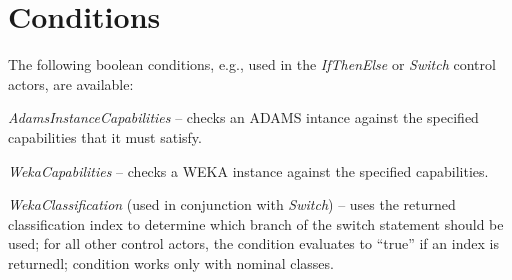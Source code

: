 \section{Conditions}
The following boolean conditions, e.g., used in the \textit{IfThenElse} or
\textit{Switch} control actors, are available:
\begin{tight_itemize}
	\item \textit{AdamsInstanceCapabilities} -- checks an ADAMS intance against
	the specified capabilities that it must satisfy.
	\item \textit{WekaCapabilities} -- checks a WEKA instance against the
	specified capabilities.
	\item \textit{WekaClassification} (used in conjunction with 
	\textit{Switch}) -- uses the returned classification index to determine 
	which branch of the switch statement should be used; for all other control 
	actors, the condition evaluates to ``true'' if an index is returnedl; 
	condition works only with nominal classes.
\end{tight_itemize}

